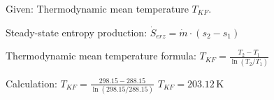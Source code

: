 Given: Thermodynamic mean temperature \( T_{KF} \).  

Steady-state entropy production:  
\( \dot{S}_{erz} = \dot{m} \cdot (s_{2} - s_{1}) \)  

Thermodynamic mean temperature formula:  
\( T_{KF} = \frac{T_2 - T_1}{\ln(T_2 / T_1)} \)  

Calculation:  
\( T_{KF} = \frac{298.15 - 288.15}{\ln(298.15 / 288.15)} \)  
\( T_{KF} = 203.12 \, \text{K} \)